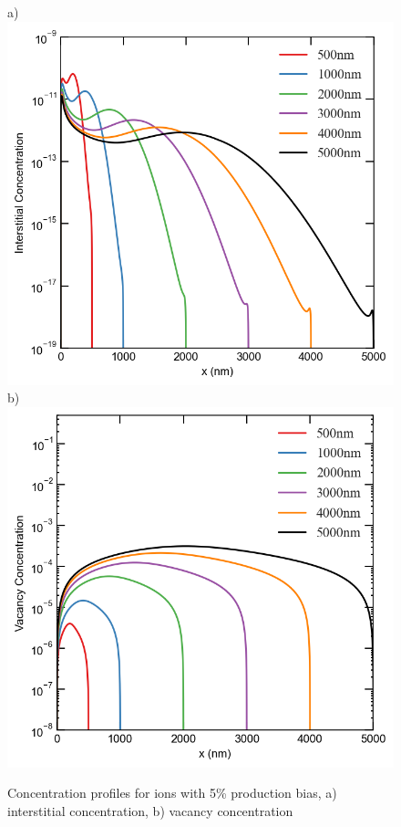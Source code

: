 \documentclass[utf8]{frontiersSCNS} %
\begin{document}
      \begin{figure}[h!]  %
        \centering
        a)\includegraphics[scale=0.55]{interstitial_concentration_500-5000nm-ion-5}
        b)\includegraphics[scale=0.55]{vacancy_concentration_500-5000nm-ion-5}
        \caption{Concentration profiles for ions with 5\% production bias, a) interstitial concentration, b) vacancy concentration}
        \label{figure:concentrations_ion_5_1e-3}
      \end{figure}
\end{document}
